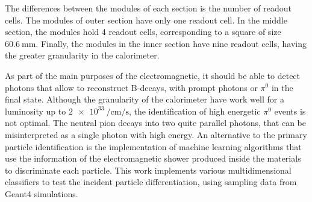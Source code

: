 The differences between the modules of each section is the number of readout
cells. The modules of outer section have only one readout cell. In the middle
section, the modules hold 4 readout cells, corresponding to a square of size
\(\SI{60.6}{\milli\metre}\). Finally, the modules in the inner section have
nine readout cells, having the greater granularity in the
calorimeter\cite{omelaenko2000lhcb}.

As part of the main purposes of the electromagnetic, it should be able to
detect photons that allow to reconstruct B-decays, with prompt photons or
\(\pi^0\) in the final state\cite{omelaenko2000lhcb,Boldyrev_2020}. Although
the granularity of the calorimeter have work well for a luminosity up to
\(\SI{2e33}{\per\centi\metre\per\second}\)\cite{guz2013lhcb}, the
identification of high energetic \(\pi^0\) events is not optimal. The neutral
pion decays into two quite parallel photons, that can be misinterpreted as a
single photon with high energy. An alternative to the primary particle
identification is the implementation of machine learning algorithms that use
the information of the electromagnetic shower produced inside the materials to
discriminate each particle\cite{Boldyrev_2020}. This work implements various
multidimensional classifiers to test the incident particle differentiation,
using sampling data from Geant4 simulations.
